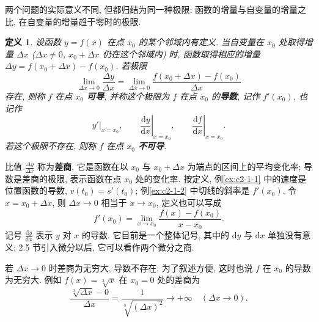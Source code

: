 \documentclass[UTF8,openany]{ctexbook}
\theoremstyle{chinesetextbook}
\newtheorem{definition}{定义}[section]
\newcommand{\dd}{\mathrm d}
\begin{document}
\begin{center}
\end{center}
两个问题的实际意义不同, 但都归结为同一种极限: 函数的增量与自变量的增量之比, 在自变量的增量趋于零时的极限.
\begin{definition}
设函数 $y=f(x)$ 在点 $x_0$ 的某个邻域内有定义. 当自变量在 $x_0$ 处取得增量 $\Delta x$ ($\Delta x\ne0$, $x_0+\Delta x$ 仍在这个邻域内) 时, 函数取得相应的增量 $\Delta y=f(x_0+\Delta x)-f(x_0)$. 若极限
\[
\lim_{\Delta x\to0}\frac{\Delta y}{\Delta x}=\lim_{\Delta x\to0}\frac{f(x_0+\Delta x)-f(x_0)}{\Delta x}
\]
存在, 则称 $f$ 在点 $x_0$ \textbf{可导}, 并称这个极限为 $f$ 在点 $x_0$ 的\textbf{导数}, 记作 $f'(x_0)$, 也记作
\[
y'\big|_{x=x_0},\qquad\left.\frac{\dd y}{\dd x}\right|_{x=x_0},\qquad\left.\frac{\dd f}{\dd x}\right|_{x=x_0}.
\]
若这个极限不存在, 则称 $f$ 在点 $x_0$ \textbf{不可导}.
\end{definition}
比值 $\displaystyle\frac{\Delta y}{\Delta x}$ 称为\textbf{差商}, 它是函数在以 $x_0$ 与 $x_0+\Delta x$ 为端点的区间上的平均变化率; 导数是差商的极限, 表示函数在点 $x_0$ 处的变化率. 按定义, 例\ref{ex:c2-1-1} 中的速度是位置函数的导数, $v(t_0)=s'(t_0)$; 例\ref{ex:c2-1-2} 中切线的斜率是 $f'(x_0)$. 令 $x=x_0+\Delta x$, 则 $\Delta x\to0$ 相当于 $x\to x_0$, 定义也可以写成
\[
f'(x_0)=\lim_{x\to x_0}\frac{f(x)-f(x_0)}{x-x_0}.
\]
记号 $\displaystyle\frac{\dd y}{\dd x}$ 表示 $y$ 对 $x$ 的导数. 它目前是一个整体记号, 其中的 $\dd y$ 与 $\dd x$ 单独没有意义; 2.5 节引入微分以后, 它可以看作两个微分之商.

若 $\Delta x\to0$ 时差商为无穷大, 导数不存在; 为了叙述方便, 这时也说 $f$ 在 $x_0$ 的导数为无穷大. 例如 $f(x)=\sqrt[3]x$ 在 $x_0=0$ 处的差商为
\[
\frac{\sqrt[3]{\Delta x}-0}{\Delta x}=\frac1{\sqrt[3]{(\Delta x)^2}}\to+\infty\quad(\Delta x\to0).
\]
\end{document}
